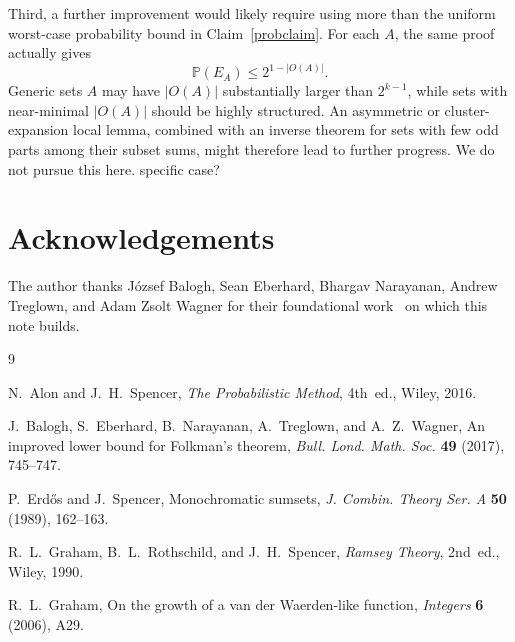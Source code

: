 \documentclass[12pt,a4paper,english,reqno]{amsart}
\theoremstyle{plain}
\theoremstyle{remark}
\begin{document}
Third, a further improvement would likely require using more than the uniform worst-case probability bound in Claim~\ref{probclaim}. For each $A$, the same proof actually gives
\[
\mathbb P(E_A)\le 2^{1-|O(A)|}.
\]
Generic sets $A$ may have $|O(A)|$ substantially larger than $2^{k-1}$, while sets with near-minimal $|O(A)|$ should be highly structured. An asymmetric or cluster-expansion local lemma, combined with an inverse theorem for sets with few odd parts among their subset sums, might therefore lead to further progress. We do not pursue this here.
specific case?

\section*{Acknowledgements}
The author thanks J\'{o}zsef Balogh, Sean Eberhard, Bhargav Narayanan, Andrew Treglown, and Adam Zsolt Wagner for their foundational work~\cite{BENTW} on which this note builds.

\begin{thebibliography}{9}

N.~Alon and J.~H.~Spencer,
\emph{The Probabilistic Method},
4th~ed., Wiley, 2016.

J.~Balogh, S.~Eberhard, B.~Narayanan, A.~Treglown, and A.~Z.~Wagner,
An improved lower bound for Folkman's theorem,
\emph{Bull. Lond. Math. Soc.} \textbf{49} (2017), 745--747.

P.~Erd\H{o}s and J.~Spencer,
Monochromatic sumsets,
\emph{J. Combin. Theory Ser. A} \textbf{50} (1989), 162--163.

R.~L.~Graham, B.~L.~Rothschild, and J.~H.~Spencer,
\emph{Ramsey Theory},
2nd~ed., Wiley, 1990.

R.~L.~Graham,
On the growth of a van der Waerden-like function,
\emph{Integers} \textbf{6} (2006), A29.

\end{thebibliography}
\end{document}
